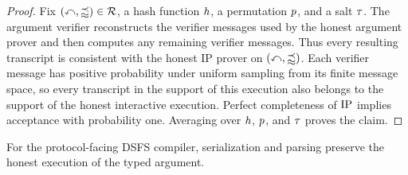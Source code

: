 \begin{proof}
Fix \((\mathbb{x},\mathbb{w})\in\mathcal{R}\), a hash function \(h\), a permutation \(p\), and a salt \(\tau\). The argument verifier reconstructs the verifier messages used by the honest argument prover and then computes any remaining verifier messages. Thus every resulting transcript is consistent with the honest IP prover on \((\mathbb{x},\mathbb{w})\). Each verifier message has positive probability under uniform sampling from its finite message space, so every transcript in the support of this execution also belongs to the support of the honest interactive execution. Perfect completeness of \(\mathrm{IP}\) implies acceptance with probability one. Averaging over \(h\), \(p\), and \(\tau\) proves the claim.
\leanok
\end{proof}

\begin{remark}
\label{rem:dsfs_byte_execution}
\leanok
{}
For the protocol-facing DSFS compiler, serialization and parsing preserve the honest execution
of the typed argument.
\end{remark}
